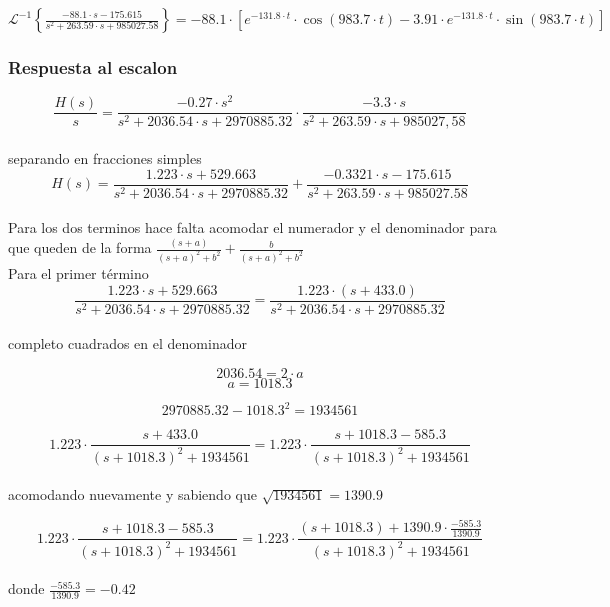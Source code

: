\documentclass[10pt,a4paper]{article}
\begin{document}
    $\mathscr{L}^{-1}\left\{\frac{-88.1 \cdot s - 175.615}{s^{2}+263.59 \cdot s + 985027.58}\right\}= -88.1\cdot \left[ e^{-131.8 \cdot t} \cdot \cos{(983.7\cdot t)} -3.91 \cdot e^{-131.8 \cdot t} \cdot \sin{(983.7\cdot t)}  \right] $ \\




    \subsubsection{Respuesta al escalon}

    \[\frac{H(s)}{s}=\frac{-0.27 \cdot s^2}{s^{2}+2036.54 \cdot s + 2970885.32} \cdot \frac{-3.3 \cdot s}{s^{2}+263.59 \cdot s+ 985027,58}\] \\


    separando en fracciones simples
    \[H(s)=\frac{1.223 \cdot s + 529.663}{s^{2}+2036.54 \cdot s + 2970885.32} + \frac{-0.3321 \cdot s - 175.615}{s^{2}+263.59 \cdot s + 985027.58}\] \\


    Para los dos terminos hace falta acomodar el numerador y el denominador para que queden de la forma $\frac{(s+a)}{(s+a)^2+b^2} +\frac{b}{(s+a)^2+b^2}$ \\


    Para el primer término \\


    \[\frac{1.223 \cdot s + 529.663}{s^{2}+2036.54 \cdot s + 2970885.32} = \frac{1.223 \cdot (s + 433.0)}{s^{2}+2036.54 \cdot s + 2970885.32}\] \\


    completo cuadrados en el denominador

    \[2036.54 = 2\cdot a\]
    \[a = 1018.3\]

    \[2970885.32-1018.3^2 = 1934561\]



    \[1.223\cdot \frac{s + 433.0}{{(s + 1018.3)^{2}}+1934561} = 1.223\cdot\frac{s +1018.3 -585.3}{{(s+1018.3)^{2}}+1934561}\] \\

    acomodando nuevamente y sabiendo que $\sqrt{1934561} = 1390.9$


    \[1.223\cdot\frac{s +1018.3 -585.3}{{(s+1018.3)^{2}}+1934561} = 1.223\cdot \frac{(s +1018.3) + 1390.9\cdot \frac{-585.3}{1390.9}}{{(s+1018.3)^{2}}+1934561}\] \\

    donde $\frac{-585.3}{1390.9} = -0.42$ \\
\end{document}
